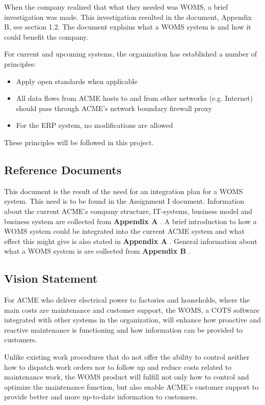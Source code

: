 \documentclass[a4paper]{article}
\begin{document}
When the company realized that what they needed was WOMS, a brief investigation was made. This investigation resulted in the document, Appendix B, see section 1.2. The document explains what a WOMS system is and how it could benefit the company.

For current and upcoming systems, the organization has established a number of principles:
\begin{itemize}
\item Apply open standards when applicable
\item All data flows from ACME hosts to and from other networks (e.g. Internet) should pass through ACME's network boundary firewall proxy
\item For the ERP system, no modifications are allowed
\end{itemize}

These principles will be followed in this project. 
 
\subsection{Reference Documents} 
\label{sub:reference_documents}

This document is the result of the need for an integration plan for a WOMS system. This need is to be found in the Assignment I document. Information about the current ACME's company structure, IT-systems, business model and business system are collected from \textbf{Appendix A} \cite{A}. A brief introduction to how a WOMS system could be integrated into the current ACME system and what effect this might give is also stated in \textbf{Appendix A} \cite{A}. General information about what a WOMS system is are collected from \textbf{Appendix B} \cite{B}.

\subsection{Vision Statement}
\label{sub:vision_statement}
For ACME who deliver electrical power to factories and households, where the main costs are maintenance and customer support, the WOMS, a COTS software integrated with other systems in the organization, will enhance how proactive and reactive maintenance is functioning and how information can be provided to customers. 

Unlike existing work procedures that do not offer the ability to control neither how to dispatch work orders nor to follow up and reduce costs related to maintenance work, the WOMS product will fulfill not only how to control and optimize the maintenance function, but also enable ACME's customer support to provide better and more up-to-date information to customers. 
\end{document}
